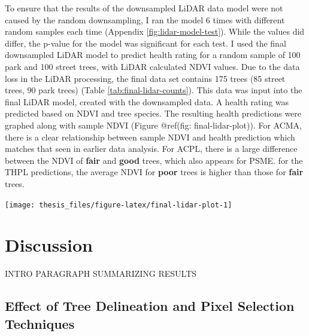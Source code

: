\documentclass[12pt,twoside]{reedthesis}
\begin{document}
To ensure that the results of the downsampled LiDAR data model were not caused by the random downsampling, I ran the model 6 times with different random samples each time (Appendix \ref{fig:lidar-model-test}). While the values did differ, the p-value for the model was significant for each test. I used the final downsampled LiDAR model to predict health rating for a random sample of 100 park and 100 street trees, with LiDAR calculated NDVI values. Due to the data loss in the LiDAR processing, the final data set contains 175 trees (85 street trees, 90 park trees) (Table \ref{tab:final-lidar-counts}). This data was input into the final LiDAR model, created with the downsampled data. A health rating was predicted based on NDVI and tree species. The resulting health predictions were graphed along with sample NDVI (Figure @ref(fig: final-lidar-plot)). For ACMA, there is a clear relationship between sample NDVI and health prediction which matches that seen in earlier data analysis. For ACPL, there is a large difference between the NDVI of \textbf{fair} and \textbf{good} trees, which also appears for PSME. for the THPL predictions, the average NDVI for \textbf{poor} trees is higher than those for \textbf{fair} trees.
\begin{center}\texttt{[image: thesis\_files/figure-latex/final-lidar-plot-1]} \end{center}

\hypertarget{discussion}{%
\chapter{Discussion}\label{discussion}}

INTRO PARAGRAPH SUMMARIZING RESULTS

\hypertarget{effect-of-tree-delineation-and-pixel-selection-techniques}{%
\section{Effect of Tree Delineation and Pixel Selection Techniques}\label{effect-of-tree-delineation-and-pixel-selection-techniques}}
\end{document}
